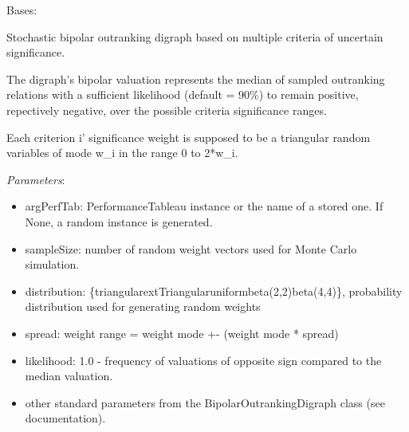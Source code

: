 \documentclass[letterpaper,10pt,english]{sphinxmanual}
\begin{document}
\begin{fulllineitems}
\label{techDoc:outrankingDigraphs.StochasticBipolarOutrankingDigraph}
Bases: {\hyperref[techDoc:outrankingDigraphs.BipolarOutrankingDigraph]{\emph{}}}

Stochastic bipolar outranking digraph based on multiple criteria of uncertain significance.

The digraph's bipolar valuation represents the median of sampled outranking relations with a
sufficient likelihood (default = 90\%) to remain positive, repectively negative,
over the possible criteria significance ranges.

Each criterion i' significance weight is supposed to
be a triangular random variables of mode w\_i in the range 0 to 2*w\_i.

\emph{Parameters}:
\begin{itemize}
\item {} 
argPerfTab: PerformanceTableau instance or the name of a stored one.
If None, a random instance is generated.

\item {} 
sampleSize: number of random weight vectors used for Monte Carlo simulation.

\item {} 
distribution: \{triangular\textbar{}extTriangular\textbar{}uniform\textbar{}beta(2,2)\textbar{}beta(4,4)\}, probability distribution used for generating random weights

\item {} 
spread: weight range = weight mode +- (weight mode * spread)

\item {} 
likelihood: 1.0 - frequency of valuations of opposite sign compared to the median valuation.

\item {} 
other standard parameters from the BipolarOutrankingDigraph class (see documentation).

\end{itemize}


\end{fulllineitems}
\end{document}
